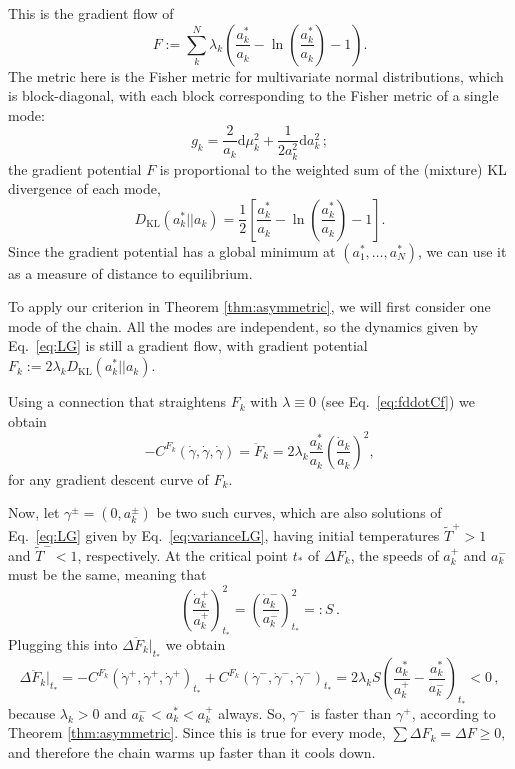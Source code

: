 \documentclass{amsart}
\theoremstyle{definition}
\begin{document}
This is the gradient flow of 
$$F:=\sum_k^N\lambda_k\left(\frac{a_k^*}{a_k}-\ln\left(\frac{a_k^*}{a_k}\right)-1\right).$$
The metric here is the Fisher metric for multivariate normal distributions, which is block-diagonal, 
with each block corresponding to the Fisher metric of a single mode:
\begin{equation*}
    g_k=\frac{2}{a_k}\mathrm{d}\mu_k^2+\frac{1}{2a_k^2}\mathrm{d}a_k^2\,;
\end{equation*}
the gradient potential $F$ is proportional to the weighted sum of the (mixture) KL divergence of each mode,
\begin{equation*}
    D_\text{KL}(a_k^*||a_k)=\frac{1}{2}\left[\frac{a_k^*}{a_k}-\ln\left(\frac{a_k^*}{a_k}\right)-1\right].
\end{equation*}
 Since the gradient potential has a global minimum at $(a_1^*,\ldots,a_N^*)$, we can use it as a measure of distance to equilibrium.

To apply our criterion in Theorem \ref{thm:asymmetric},
we will first consider one mode of the chain.
All the modes are independent, 
so the dynamics given by Eq.~\eqref{eq:LG} is still a gradient flow,
with gradient potential $F_k:=2\lambda_kD_\text{KL}(a_k^*||a_k)$.

Using a connection that straightens $F_k$ with $\lambda\equiv0$ (see Eq.~\eqref{eq:fddotCf}) we obtain
\begin{equation*}
    -C^{F_k}(\dot\gamma,\dot\gamma,\dot\gamma)=\ddot F_k=2\lambda_k\frac{a_k^*}{a_k}\left(\frac{\dot a_k}{a_k}\right)^2,
\end{equation*}
for any gradient descent curve of $F_k$.

Now, let $\gamma^\pm=(0,a_k^\pm)$ be two such curves,
which are also solutions of Eq.~\eqref{eq:LG} given by Eq.~\eqref{eq:varianceLG}, 
having initial temperatures
$\tilde T^+>1$ and $\tilde T^-<1$, respectively.
At the critical point $t_*$ of $\Delta F_k$,
the speeds of $a_k^+$ and $a_k^-$ must be the same, meaning that
\begin{equation*}
    \left(\frac{\dot a_k^+}{a_k^+}\right)_{t_*}^2=\left(\frac{\dot a_k^-}{a_k^-}\right)_{t_*}^2=:S\,.
\end{equation*}
Plugging this into $\Delta\ddot F_k|_{t_*}$ we obtain
\begin{equation*}
    \Delta\ddot F_k|_{t_*}=-C^{F_k}(\dot\gamma^+,\dot\gamma^+,\dot\gamma^+)_{t_*}+C^{F_k}(\dot\gamma^-,\dot\gamma^-,\dot\gamma^-)_{t_*}=2\lambda_k S\left(\frac{a_k^*}{a_k^+}-\frac{a_k^*}{a_k^-}\right)_{t_*}<0\,,
\end{equation*}
because $\lambda_k>0$ and $a_k^-<a_k^*<a_k^+$ always. 
So, $\gamma^-$ is faster than $\gamma^+$, according to Theorem \ref{thm:asymmetric}.
Since this is true for every mode, 
$\sum \Delta F_k=\Delta F\geq 0$, 
and therefore the chain warms up faster than it cools down.
\end{document}
